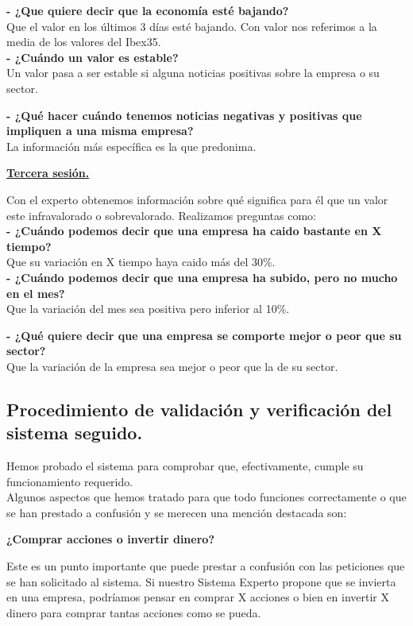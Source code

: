 \documentclass[12pt]{article}
\begin{document}
\textbf{- ¿Que quiere decir que la economía esté bajando?}\\
Que el valor en los últimos 3 días esté bajando. Con valor nos referimos a la media de los valores del Ibex35. \\

\textbf{- ¿Cuándo un valor es estable?}\\
Un valor pasa a ser estable si alguna noticias positivas sobre la empresa o su sector.

\textbf{- ¿Qué hacer cuándo tenemos noticias negativas y positivas que impliquen a una misma empresa?}\\
La información más específica es la que predonima. \\

\begin{center}
	\underline{\textbf{Tercera sesión.}}
\end{center}

Con el experto obtenemos información sobre qué significa para él que un valor este infravalorado o sobrevalorado. Realizamos preguntas como:\\

\textbf{- ¿Cuándo podemos decir que una empresa ha caido bastante en X tiempo?}\\
Que su variación en X tiempo haya caido más del 30\%.\\

\textbf{- ¿Cuándo podemos decir que una empresa ha subido, pero no mucho en el mes?}\\
Que la variación del mes sea positiva pero inferior al 10\%.

\textbf{- ¿Qué quiere decir que una empresa se comporte mejor o peor que su sector?}\\
Que la variación de la empresa sea mejor o peor que la de su sector. 

\bigskip
\bigskip
\bigskip
\bigskip
\subsection{Procedimiento de validación y verificación del sistema seguido.}
Hemos probado el sistema para comprobar que, efectivamente, cumple su funcionamiento requerido.\\
Algunos aspectos que hemos tratado para que todo funciones correctamente o que se han prestado a confusión y se merecen una mención destacada son:\\

\begin{center}
	\textbf{¿Comprar acciones o invertir dinero?}
\end{center}
Este es un punto importante que puede prestar a confusión con las peticiones que se han solicitado al sistema. Si nuestro Sistema Experto propone que se invierta en una empresa, podríamos pensar en comprar X acciones o bien en invertir X dinero para comprar tantas acciones como se pueda. \\
\end{document}
